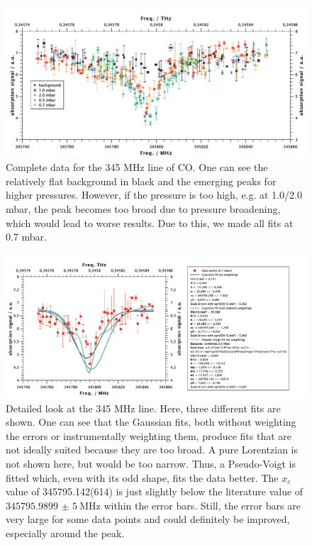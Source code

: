 \documentclass[a4paper,10pt]{scrartcl}
\begin{document}
\begin{figure}[H]
\centering
\includegraphics[width=\textwidth]{img/co_345_all}
\caption{Complete data for the 345 MHz line of CO. One can see the relatively flat background in black and the emerging peaks for higher pressures. However, if the pressure is too high, e.g. at 1.0/2.0 mbar, the peak becomes too broad due to pressure broadening, which would lead to worse results. Due to this, we made all fits at 0.7 mbar.}
\label{fig:co_all}
\end{figure}

\begin{figure}[H]
\centering
\includegraphics[width=\textwidth]{img/co_345}
\caption{Detailed look at the 345 MHz line. Here, three different fits are shown. One can see that the Gaussian fits, both without weighting the errors or instrumentally weighting them, produce fits that are not ideally suited because they are too broad. A pure Lorentzian is not shown here, but would be too narrow. Thus, a Pseudo-Voigt is fitted which, even with its odd shape, fits the data better. The $x_c$ value of 345795.142(614) is just slightly below the literature value of $\SI{345795,9899(5)}{\mega\hertz}$ within the error bars. Still, the error bars are very large for some data points and could definitely be improved, especially around the peak.}
\label{fig:co_345_detail}
\end{figure}
\end{document}
